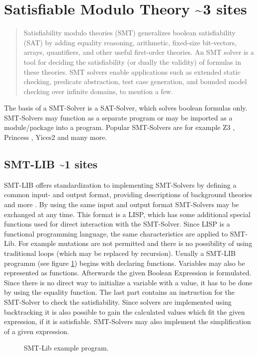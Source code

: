 

\section{Satisfiable Modulo Theory \textasciitilde 3 sites}
\begin{quote}
	Satisfiability modulo theories (SMT) generalizes boolean satisfiability (SAT) by
	adding equality reasoning, arithmetic, fixed-size bit-vectors, arrays, quantifiers,
	and other useful first-order theories. An SMT solver is a tool for deciding the satisfiability (or dually the validity) of formulas in these theories. SMT solvers enable
	applications such as extended static checking, predicate abstraction, test case generation, and bounded model checking over infinite domains, to mention a few. \cite{demouraZ3EfficientSMT2008}
\end{quote}

The basis of a SMT-Solver is a SAT-Solver, which solves boolean formulas only. SMT-Solvers may function as a separate program or may be imported as a module/package into a program. 
Popular SMT-Solvers are for example Z3 \cite{demouraZ3EfficientSMT2008}, Princess \cite{princess08}, Yices2 \cite{Dutertre:cav2014} and many more.

\subsection{SMT-LIB \textasciitilde 1 sites}
SMT-LIB offers standardization to implementing SMT-Solvers by defining a common input- and output format, providing descriptions of background theories and more \cite{cokSMTLIBv2LanguageTools}. %
By using the same input and output format SMT-Solvers may be exchanged at any time. 
This format is a LISP, which has some additional special functions used for direct interaction with the SMT-Solver. Since LISP is a functional programming language, the same characteristics are applied to SMT-Lib.
For example mutations are not permitted and there is no possibility of using traditional loops (which may be replaced by recursion).
Usually a SMT-LIB programm (see figure \ref{code:smt-lib}) begins with declaring functions. Variables may also be represented as functions. 
Afterwards the given Boolean Expression is formulated. Since there is no direct way to initialize a variable with a value, it has to be done by using the equality function. 
The last part contains an instruction for the SMT-Solver to check the satisfiability. 
Since solvers are implemented using backtracking it is also possible to gain the calculated values which fit the given expression, if it is satisfiable. 
SMT-Solvers may also implement the simplification of a given expression.

\begin{figure}
	\begin{GenericCode}
	\end{GenericCode}
	\caption{SMT-Lib example program.}
	\label{code:smt-lib}
\end{figure}



